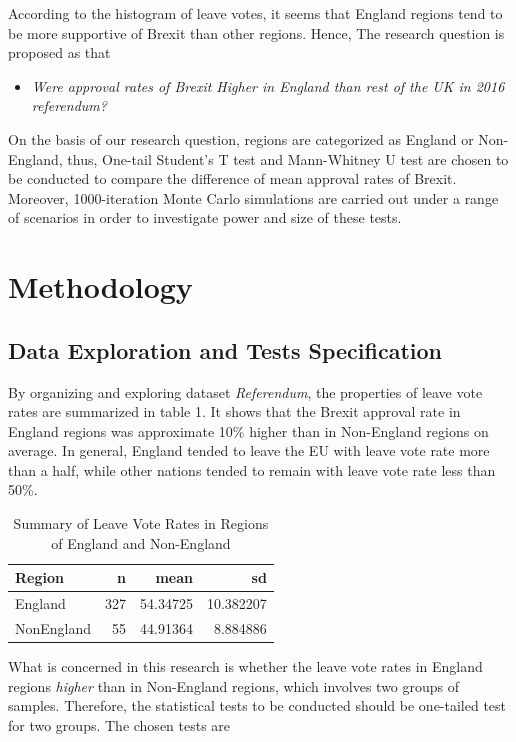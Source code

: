 \documentclass[]{article}
\providecommand{\tightlist}{%
  \setlength{\itemsep}{0pt}\setlength{\parskip}{0pt}}
\begin{document}
According to the histogram of leave votes, it seems that England regions
tend to be more supportive of Brexit than other regions. Hence, The
research question is proposed as that

\begin{itemize}
\tightlist
\item
  \emph{Were approval rates of Brexit Higher in England than rest of the
  UK in 2016 referendum?}
\end{itemize}

On the basis of our research question, regions are categorized as
England or Non-England, thus, One-tail Student's T test and Mann-Whitney
U test are chosen to be conducted to compare the difference of mean
approval rates of Brexit. Moreover, 1000-iteration Monte Carlo
simulations are carried out under a range of scenarios in order to
investigate power and size of these tests.

\hypertarget{methodology}{%
\section{Methodology}\label{methodology}}

\hypertarget{data-exploration-and-tests-specification}{%
\subsection{Data Exploration and Tests
Specification}\label{data-exploration-and-tests-specification}}

By organizing and exploring dataset \emph{Referendum}, the properties of
leave vote rates are summarized in table 1. It shows that the Brexit
approval rate in England regions was approximate 10\% higher than in
Non-England regions on average. In general, England tended to leave the
EU with leave vote rate more than a half, while other nations tended to
remain with leave vote rate less than 50\%.

\begin{longtable}[t]{lrrr}
\caption{\label{tab:dataset}Summary of Leave Vote Rates in Regions of England and Non-England}\\
\toprule
Region & n & mean & sd\\
\midrule
England & 327 & 54.34725 & 10.382207\\
NonEngland & 55 & 44.91364 & 8.884886\\
\bottomrule
\end{longtable}

What is concerned in this research is whether the leave vote rates in
England regions \emph{higher} than in Non-England regions, which
involves two groups of samples. Therefore, the statistical tests to be
conducted should be one-tailed test for two groups. The chosen tests are
\end{document}
